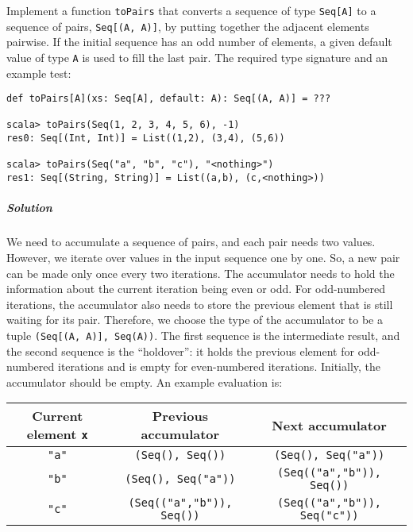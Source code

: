 Implement a function \lstinline!toPairs! that converts a sequence
of type \lstinline!Seq[A]! to a sequence of pairs, \lstinline!Seq[(A, A)]!,
by putting together the adjacent elements pairwise. If the initial
sequence has an odd number of elements, a given default value of type
\lstinline!A! is used to fill the last pair. The required type signature
and an example test:
\begin{lstlisting}
def toPairs[A](xs: Seq[A], default: A): Seq[(A, A)] = ???

scala> toPairs(Seq(1, 2, 3, 4, 5, 6), -1)
res0: Seq[(Int, Int)] = List((1,2), (3,4), (5,6))

scala> toPairs(Seq("a", "b", "c"), "<nothing>")
res1: Seq[(String, String)] = List((a,b), (c,<nothing>)) 
\end{lstlisting}


\subparagraph{Solution}

We need to accumulate a sequence of pairs, and each pair needs two
values. However, we iterate over values in the input sequence one
by one. So, a new pair can be made only once every two iterations.
The accumulator needs to hold the information about the current iteration
being even or odd. For odd-numbered iterations, the accumulator also
needs to store the previous element that is still waiting for its
pair. Therefore, we choose the type of the accumulator to be a tuple
\lstinline!(Seq[(A, A)], Seq(A))!. The first sequence is the intermediate
result, and the second sequence is the \textsf{``}holdover\textsf{''}: it holds the
previous element for odd-numbered iterations and is empty for even-numbered
iterations. Initially, the accumulator should be empty. An example
evaluation is:
\begin{center}
\begin{tabular}{|c|c|c|}
\hline 
\textbf{\small{}Current element }\lstinline!x! & \textbf{\small{}Previous accumulator} & \textbf{\small{}Next accumulator}\tabularnewline
\hline 
\hline 
{\small{}}\lstinline!"a"! & {\small{}}\lstinline!(Seq(), Seq())! & {\small{}}\lstinline!(Seq(), Seq("a"))!\tabularnewline
\hline 
{\small{}}\lstinline!"b"! & {\small{}}\lstinline!(Seq(), Seq("a"))! & {\small{}}\lstinline!(Seq(("a","b")), Seq())!\tabularnewline
\hline 
{\small{}}\lstinline!"c"! & {\small{}}\lstinline!(Seq(("a","b")), Seq())! & {\small{}}\lstinline!(Seq(("a","b")), Seq("c"))!\tabularnewline
\hline 
\end{tabular}
\par\end{center}


